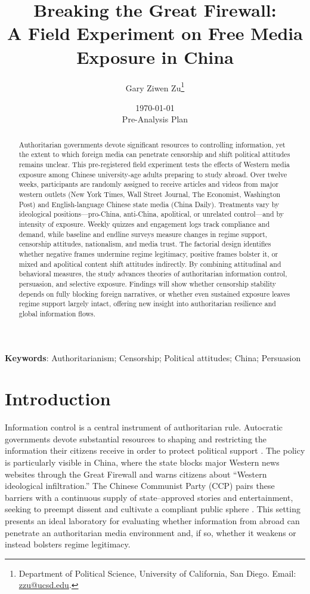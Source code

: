 \documentclass[12pt, american]{article}
\title{\textbf{Breaking the Great Firewall:\\ A Field Experiment on Free Media Exposure in China}}
\author{Gary Ziwen Zu\thanks{Department of Political Science, University of California, San Diego. Email: \href{mailto:zzu@ucsd.edu}{zzu@ucsd.edu}.}}
\date{ \monthyear\today \\ \vspace{0.2cm} Pre-Analysis Plan}
\begin{document}
\maketitle
\thispagestyle{empty}


\begin{abstract}  
\noindent  
Authoritarian governments devote significant resources to controlling information, yet the extent to which foreign media can penetrate censorship and shift political attitudes remains unclear. This pre-registered field experiment tests the effects of Western media exposure among Chinese university-age adults preparing to study abroad. Over twelve weeks, participants are randomly assigned to receive articles and videos from major western outlets (New York Times, Wall Street Journal, The Economist, Washington Post) and English-language Chinese state media (China Daily). Treatments vary by ideological positions—pro-China, anti-China, apolitical, or unrelated control—and by intensity of exposure. Weekly quizzes and engagement logs track compliance and demand, while baseline and endline surveys measure changes in regime support, censorship attitudes, nationalism, and media trust. The factorial design identifies whether negative frames undermine regime legitimacy, positive frames bolster it, or mixed and apolitical content shift attitudes indirectly. By combining attitudinal and behavioral measures, the study advances theories of authoritarian information control, persuasion, and selective exposure. Findings will show whether censorship stability depends on fully blocking foreign narratives, or whether even sustained exposure leaves regime support largely intact, offering new insight into authoritarian resilience and global information flows.
\end{abstract}



 \textbf{Keywords}: Authoritarianism; Censorship; Political attitudes; China;  Persuasion
	
	\newpage
	
	\setcounter{page}{1} 
	\renewcommand{\thepage}{\arabic{page}}
\doublespacing
	\section{Introduction}

Information control is a central instrument of authoritarian rule. Autocratic governments devote substantial resources to shaping and restricting the information their citizens receive in order to protect political support \citep{guriev2019informational, king2013censorship}. The policy is particularly visible in China, where the state blocks major Western news websites through the Great Firewall and warns citizens about “Western ideological infiltration.” The Chinese Communist Party (CCP) pairs these barriers with a continuous supply of state–approved stories and entertainment, seeking to preempt dissent and cultivate a compliant public sphere \citep{stockmann2013media, roberts2018censored}. This setting presents an ideal laboratory for evaluating whether information from abroad can penetrate an authoritarian media environment and, if so, whether it weakens or instead bolsters regime legitimacy.
\end{document}
